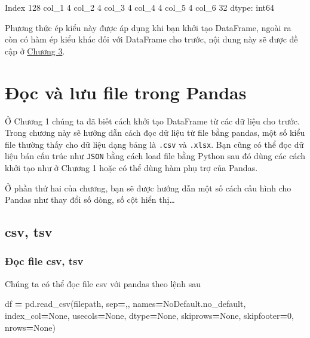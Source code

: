 \documentclass[
]{book}
\newenvironment{Shaded}{\begin{snugshade}}{\end{snugshade}}
\newcommand{\DecValTok}[1]{\textcolor[rgb]{0.00,0.00,0.81}{#1}}
\newcommand{\NormalTok}[1]{#1}
\newcommand{\OperatorTok}[1]{\textcolor[rgb]{0.81,0.36,0.00}{\textbf{#1}}}
\newcommand{\StringTok}[1]{\textcolor[rgb]{0.31,0.60,0.02}{#1}}
\newcommand{\VariableTok}[1]{\textcolor[rgb]{0.00,0.00,0.00}{#1}}
\begin{document}
\begin{Shaded}
\begin{Highlighting}[]
\NormalTok{Index    128}
\NormalTok{col\_1      4}
\NormalTok{col\_2      4}
\NormalTok{col\_3      4}
\NormalTok{col\_4      4}
\NormalTok{col\_5      4}
\NormalTok{col\_6     32}
\NormalTok{dtype: int64}
\end{Highlighting}
\end{Shaded}

Phương thức ép kiểu này được áp dụng khi bạn khởi tạo DataFrame, ngoài ra còn có hàm ép kiểu khác đối với DataFrame cho trước, nội dung này sẽ được đề cập ở \hyperref[Chuong-3]{Chương 3}.

\chapter{Đọc và lưu file trong Pandas}\label{ux111ux1ecdc-vuxe0-lux1b0u-file-trong-pandas}

Ở Chương 1 chúng ta đã biết cách khởi tạo DataFrame từ các dữ liệu cho trước.
Trong chương này sẽ hướng dẫn cách đọc dữ liệu từ file bằng pandas, một số kiểu file thường thấy cho dữ liệu dạng bảng là \texttt{.csv} và \texttt{.xlsx}.
Bạn cũng có thể đọc dữ liệu bán cấu trúc như \texttt{JSON} bằng cách load file bằng Python sau đó dùng các cách khởi tạo như ở Chương 1 hoặc có thể dùng
hàm phụ trợ của Pandas.

Ở phần thứ hai của chương, bạn sẽ được hướng dẫn một số cách cấu hình cho Pandas như thay đổi số dòng, số cột hiển thị\ldots{}

\section{csv, tsv}\label{csv-tsv}

\subsection{Đọc file csv, tsv}\label{ux111ux1ecdc-file-csv-tsv}

Chúng ta có thể đọc file csv với pandas theo lệnh sau

\begin{Shaded}
\begin{Highlighting}[]
\NormalTok{df }\OperatorTok{=}\NormalTok{ pd.read\_csv(filepath, sep}\OperatorTok{=}\StringTok{\textquotesingle{},\textquotesingle{}}\NormalTok{, names}\OperatorTok{=}\NormalTok{NoDefault.no\_default, index\_col}\OperatorTok{=}\VariableTok{None}\NormalTok{, usecols}\OperatorTok{=}\VariableTok{None}\NormalTok{, dtype}\OperatorTok{=}\VariableTok{None}\NormalTok{, skiprows}\OperatorTok{=}\VariableTok{None}\NormalTok{, skipfooter}\OperatorTok{=}\DecValTok{0}\NormalTok{, nrows}\OperatorTok{=}\VariableTok{None}\NormalTok{)}
\end{Highlighting}
\end{Shaded}
\end{document}
